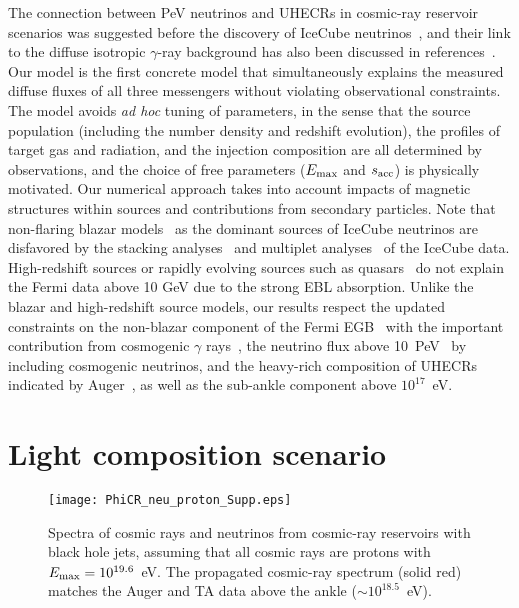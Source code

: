 \documentclass[aps,prd,onecolumn,superscriptaddress,11pt]{revtex4}
\begin{document}
The connection between PeV neutrinos and UHECRs in cosmic-ray reservoir scenarios was suggested before the discovery of IceCube neutrinos~\cite{Murase:2008yt,Kotera:2009ms}, and their link to the diffuse isotropic $\gamma$-ray background has also been discussed in references~\cite{Murase:2013rfa,2016PhRvD..94j3006M,PhysRevD.95.063007}. 
Our model is the first concrete model that simultaneously explains the measured diffuse fluxes of all three messengers without violating observational constraints. The model avoids {\it ad hoc} tuning of parameters, in the sense that the source population (including the number density and redshift evolution), the profiles of target gas and radiation, and the injection composition are all determined by observations, and the choice of free parameters ($E_{\rm max}$ and $s_{\rm acc}$) is physically motivated. Our numerical approach takes into account impacts of magnetic structures within sources and contributions from secondary particles. 
Note that non-flaring blazar models~\cite{2014PhRvD..90b3007M,PhysRevD.92.083016} as the dominant sources of IceCube neutrinos are disfavored by the stacking analyses~\cite{Aartsen:2016lir} and multiplet analyses~\cite{2016PhRvD..94j3006M} of the IceCube data. High-redshift sources or rapidly evolving sources such as quasars~\cite{PhysRevD.95.063007,Xiao:2016rvd} do not explain the Fermi data above 10 GeV due to the strong EBL absorption.
Unlike the blazar and high-redshift source models, our results respect the updated constraints on the non-blazar component of the Fermi EGB~\cite{PhysRevLett.116.151105} with the important contribution from cosmogenic $\gamma$ rays~\cite{2016PhRvD..94j3006M}, the neutrino flux above 10~PeV~\cite{2016arXiv160705886I} by including cosmogenic neutrinos, and the heavy-rich composition of UHECRs indicated by Auger~\cite{Aab:2015bza}, as well as the sub-ankle component above ${10}^{17}$~eV.

\section*{Light composition scenario}
\begin{figure}[tb]
\centering\texttt{[image: PhiCR\_neu\_proton\_Supp.eps]}
\caption{\small \label{fig:alt} Spectra of cosmic rays and neutrinos from cosmic-ray reservoirs with black hole jets, assuming that  all cosmic rays are protons with $E_{\rm max}=10^{19.6}$~eV. The propagated cosmic-ray spectrum (solid red) matches the Auger and TA data above the ankle ($\sim 10^{18.5}$~eV).
}
\end{figure} 
\end{document}
